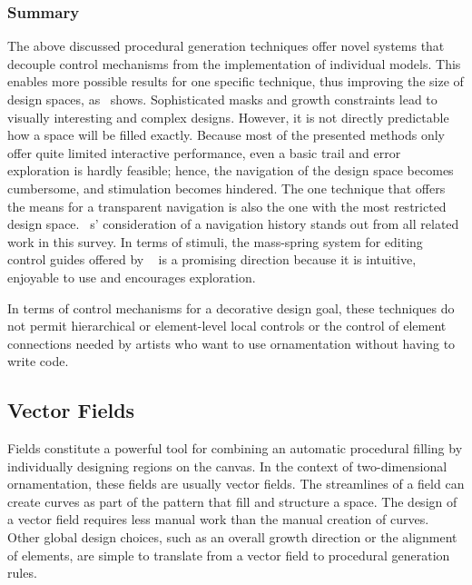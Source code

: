 
\subsubsection{Summary}
\label{subsec:analysis_masks_summary}

The above discussed procedural generation techniques offer novel systems that decouple control mechanisms from the implementation of individual models. This enables more possible results for one specific technique, thus improving the size of design spaces, as~ shows. Sophisticated masks and growth constraints lead to visually interesting and complex designs. However, it is not directly predictable how a space will be filled exactly. Because most of the presented methods only offer quite limited interactive performance, even  a basic trail and error exploration is hardly feasible; hence, the navigation of the design space becomes cumbersome, and stimulation becomes hindered. The one technique \cite{santoni_2016_ggp} that offers the means for a transparent navigation is also the one with the most restricted design space. \citeauthor*{santoni_2016_ggp}~\cite{santoni_2016_ggp}s' consideration of a navigation history stands out from all related work in this survey. In terms of stimuli, the mass-spring system for editing control guides offered by \citeauthor*{benes_2011_gpm}~\cite{benes_2011_gpm} is a promising direction because it is intuitive, enjoyable to use and encourages exploration.

In terms of control mechanisms for a decorative design goal, these techniques do not permit hierarchical or element-level local controls or the control of element connections needed by artists who want to use ornamentation without having to write code.




\subsection{Vector Fields}
\label{subsec:analysis_vectorfields}

Fields constitute a powerful tool for combining an automatic procedural filling by individually designing regions on the canvas. In the context of two-dimensional ornamentation, these fields are usually vector fields. The streamlines of a field can create curves as part of the pattern that fill and structure a space. The design of a vector field requires less manual work than the manual creation of curves. Other global design choices, such as an overall growth direction or the alignment of elements, are simple to translate from a vector field to procedural generation rules.

